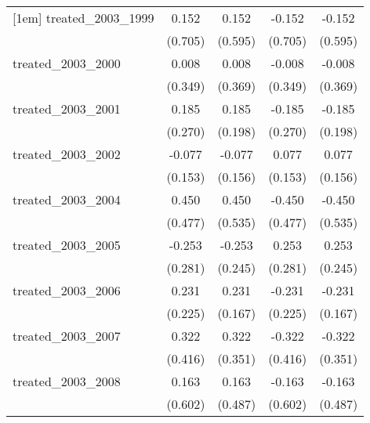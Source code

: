 {\begin{tabular}{l*{4}{c}}
[1em]
treated\_2003\_1999&       0.152         &       0.152         &      -0.152         &      -0.152         \\
            &     (0.705)         &     (0.595)         &     (0.705)         &     (0.595)         \\
[1em]
treated\_2003\_2000&       0.008         &       0.008         &      -0.008         &      -0.008         \\
            &     (0.349)         &     (0.369)         &     (0.349)         &     (0.369)         \\
[1em]
treated\_2003\_2001&       0.185         &       0.185         &      -0.185         &      -0.185         \\
            &     (0.270)         &     (0.198)         &     (0.270)         &     (0.198)         \\
[1em]
treated\_2003\_2002&      -0.077         &      -0.077         &       0.077         &       0.077         \\
            &     (0.153)         &     (0.156)         &     (0.153)         &     (0.156)         \\
[1em]
treated\_2003\_2004&       0.450         &       0.450         &      -0.450         &      -0.450         \\
            &     (0.477)         &     (0.535)         &     (0.477)         &     (0.535)         \\
[1em]
treated\_2003\_2005&      -0.253         &      -0.253         &       0.253         &       0.253         \\
            &     (0.281)         &     (0.245)         &     (0.281)         &     (0.245)         \\
[1em]
treated\_2003\_2006&       0.231         &       0.231         &      -0.231         &      -0.231         \\
            &     (0.225)         &     (0.167)         &     (0.225)         &     (0.167)         \\
[1em]
treated\_2003\_2007&       0.322         &       0.322         &      -0.322         &      -0.322         \\
            &     (0.416)         &     (0.351)         &     (0.416)         &     (0.351)         \\
[1em]
treated\_2003\_2008&       0.163         &       0.163         &      -0.163         &      -0.163         \\
            &     (0.602)         &     (0.487)         &     (0.602)         &     (0.487)         \\

\end{tabular}}
